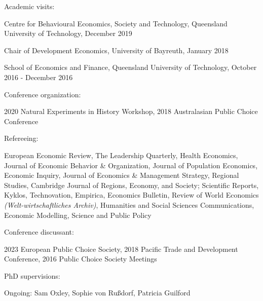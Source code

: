 \documentclass[letterpaper]{article}
\renewenvironment{itemize}{
  \begin{list}{}{
    \setlength{\leftmargin}{1.5em}
  }
}{
  \end{list}
}
\begin{document}
\begin{itemize}
	\item Academic visits:
	
	\begin{itemize}
				\item Centre for Behavioural Economics, Society and Technology, Queensland University of Technology, December 2019
		\item Chair of Development Economics, University of Bayreuth, January 2018
		\item School of Economics and Finance, Queensland University of Technology, October 2016 - December 2016
	\end{itemize}
	
	\item Conference organization:
	\begin{itemize}
		\item	2020 Natural Experiments in History Workshop, 2018 Australasian Public Choice Conference
	\end{itemize}
	

	
	\item Refereeing:
	\begin{itemize}
		
		\item European Economic Review, The Leadership Quarterly, Health Economics, Journal of Economic Behavior \& Organization, Journal of Population Economics, Economic Inquiry, Journal of Economics \& Management Strategy, Regional Studies, Cambridge Journal of Regions, Economy, and Society; Scientific Reports, Kyklos, Technovation, Empirica, Economics Bulletin, Review of World Economics {\textit{(Welt-wirtschaftliches Archiv)}}, Humanities and Social Sciences Communications, Economic Modelling, Science and Public Policy	\end{itemize}
	
	\item Conference discussant:
	\begin{itemize}
		
		\item 2023 European Public Choice Society, 2018 Pacific Trade and Development Conference, 2016 Public Choice Society Meetings
	\end{itemize}
	
	\item PhD supervisions:
	\begin{itemize}
		\item Ongoing: Sam Oxley, Sophie von Rußdorf, Patricia Guilford
	\end{itemize}
	

\end{itemize}
\end{document}
